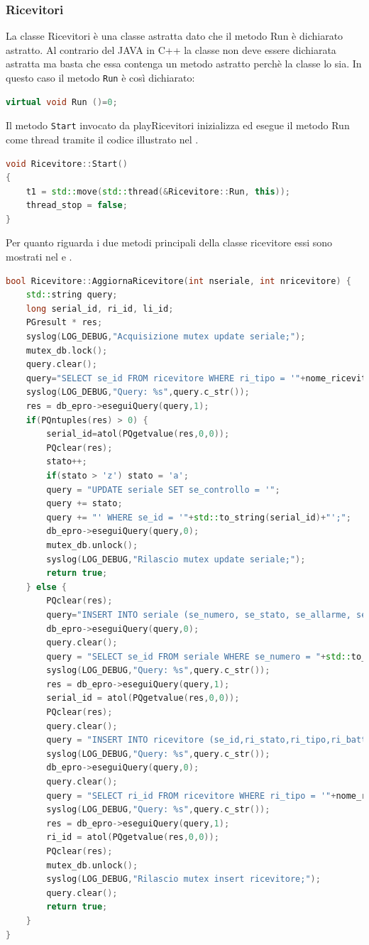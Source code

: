 \subsubsection{Ricevitori}
La classe Ricevitori è una classe astratta dato che il metodo Run è dichiarato astratto. Al contrario del JAVA in C++ la classe non deve essere dichiarata astratta ma basta che essa contenga un metodo astratto perchè la classe lo sia. In questo caso il metodo \texttt{Run} è così dichiarato:
\begin{lstlisting}[language=C++,caption=Metodo astratto Run]
virtual void Run ()=0;
\end{lstlisting}
Il metodo \texttt{Start} invocato da playRicevitori inizializza ed esegue il metodo Run come thread tramite il codice illustrato nel .
\begin{lstlisting}[language=C++,caption=Metodo Start,label=lst:start]
void Ricevitore::Start()
{
	t1 = std::move(std::thread(&Ricevitore::Run, this));
	thread_stop = false;
}
\end{lstlisting}
Per quanto riguarda i due metodi principali della classe ricevitore essi sono mostrati nel  e . 
\begin{lstlisting}[language=C++,caption=Metodo AggiornaRicevitore,label=lst:aggiornaRicevitore]
bool Ricevitore::AggiornaRicevitore(int nseriale, int nricevitore) {
	std::string query;
	long serial_id, ri_id, li_id;
	PGresult * res;
	syslog(LOG_DEBUG,"Acquisizione mutex update seriale;");
	mutex_db.lock();
	query.clear();
	query="SELECT se_id FROM ricevitore WHERE ri_tipo = '"+nome_ricevitore+"';";
	syslog(LOG_DEBUG,"Query: %s",query.c_str());
	res = db_epro->eseguiQuery(query,1);
	if(PQntuples(res) > 0) {
		serial_id=atol(PQgetvalue(res,0,0));
		PQclear(res);
		stato++;
		if(stato > 'z') stato = 'a';
		query = "UPDATE seriale SET se_controllo = '";
		query += stato;
		query += "' WHERE se_id = '"+std::to_string(serial_id)+"';";
		db_epro->eseguiQuery(query,0);
		mutex_db.unlock();
		syslog(LOG_DEBUG,"Rilascio mutex update seriale;");
		return true;
	} else {
		PQclear(res);
		query="INSERT INTO seriale (se_numero, se_stato, se_allarme, se_controllo) VALUES ('"+std::to_string(nseriale)+"','s',0,'a');";
		db_epro->eseguiQuery(query,0);
		query.clear();
		query = "SELECT se_id FROM seriale WHERE se_numero = "+std::to_string(nseriale)+";";
		syslog(LOG_DEBUG,"Query: %s",query.c_str());
		res = db_epro->eseguiQuery(query,1);
		serial_id = atol(PQgetvalue(res,0,0));
		PQclear(res);
		query.clear();
		query = "INSERT INTO ricevitore (se_id,ri_stato,ri_tipo,ri_batteria,ri_modalita,ri_mancanza_220, ri_stampante, ri_collegato, ri_numero) VALUES('"+std::to_string(serial_id)+"',0,'"+nome_ricevitore+"',0,0,0,0,0,"+std::to_string(nricevitore)+");";
		syslog(LOG_DEBUG,"Query: %s",query.c_str());
		db_epro->eseguiQuery(query,0);
		query.clear();
		query = "SELECT ri_id FROM ricevitore WHERE ri_tipo = '"+nome_ricevitore+"';";
		syslog(LOG_DEBUG,"Query: %s",query.c_str());
		res = db_epro->eseguiQuery(query,1);
		ri_id = atol(PQgetvalue(res,0,0));
		PQclear(res);
		mutex_db.unlock();
		syslog(LOG_DEBUG,"Rilascio mutex insert ricevitore;");
		query.clear();
		return true;
	}
}
\end{lstlisting}
